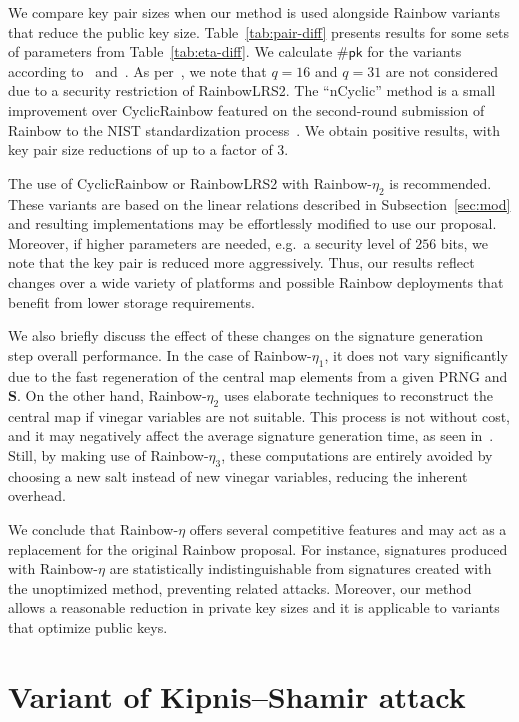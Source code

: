 \documentclass[english]{ufsc-thesis-rn46-2019/ufsc-thesis-rn46-2019}
\theoremstyle{definition}
\begin{document}
We compare key pair sizes when our method is used alongside Rainbow variants
that reduce the public key size. Table~\ref{tab:pair-diff} presents results for
some sets of parameters from Table~\ref{tab:eta-diff}. We calculate
$\#\mathsf{pk}$ for the variants according
to~\cite[Eqs.~9.2,~9.4]{Petzoldt:201307} and~\cite{Petzoldt:202004}. As
per~\cite[Remark~9.1]{Petzoldt:201307}, we note that $q = 16$ and $q = 31$ are
not considered due to a security restriction of RainbowLRS2. The ``nCyclic''
method is a small improvement over CyclicRainbow featured on the second-round
submission of Rainbow to the NIST standardization
process~\cite{Ding:201901}. We obtain positive results, with key pair size
reductions of up to a factor of 3.

The use of CyclicRainbow or RainbowLRS2 with Rainbow-$\eta_{2}$ is
recommended. These variants are based on the linear relations described in
Subsection~\ref{sec:mod} and resulting implementations may be effortlessly
modified to use our proposal. Moreover, if higher parameters are needed,
e.g.\ a security level of $256$ bits, we note that the key pair is reduced more
aggressively. Thus, our results reflect changes over a wide variety of
platforms and possible Rainbow deployments that benefit from lower storage
requirements.

We also briefly discuss the effect of these changes on the signature generation
step overall performance. In the case of Rainbow-$\eta_{1}$, it does not vary
significantly due to the fast regeneration of the central map elements from
a given PRNG and $\mathbf{S}$. On the other hand, Rainbow-$\eta_{2}$ uses
elaborate techniques to reconstruct the central map if vinegar variables are
not suitable. This process is not without cost, and it may negatively affect
the average signature generation time, as seen
in~\cite{Petzoldt:202004}. Still, by making use of Rainbow-$\eta_{3}$, these
computations are entirely avoided by choosing a new salt instead of new vinegar
variables, reducing the inherent overhead.

We conclude that Rainbow-$\eta$ offers several competitive features and may act
as a replacement for the original Rainbow proposal. For instance, signatures
produced with Rainbow-$\eta$ are statistically indistinguishable from
signatures created with the unoptimized method, preventing related
attacks. Moreover, our method allows a reasonable reduction in private key
sizes and it is applicable to variants that optimize public keys.

\chapter{Variant of Kipnis--Shamir attack}\label{ch:attack}
\end{document}

